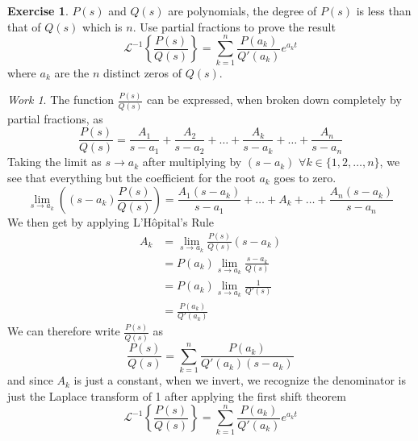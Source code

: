 \documentclass{report}
\theoremstyle{definition}
\newtheorem{exercise}{Exercise}[chapter]
\theoremstyle{remark}
\newtheorem*{work}{Work}
\newcommand{\inlt}[1]{\mathscr{L}^{-1} \left\{ #1 \right\}}
\begin{document}
\begin{exercise}
    $P(s)$ and $Q(s)$ are polynomials, the degree of $P(s)$ is less than that of $Q(s)$ which is $n$. Use partial fractions to prove the result 
    \begin{equation*}
        \inlt{\frac{P(s)}{Q(s)}} = \sum^n_{k=1} \frac{P(a_k)}{Q'(a_k)}e^{a_kt} 
    \end{equation*}
    where $a_k$ are the $n$ distinct zeros of $Q(s)$.
\end{exercise}
\begin{work}
    The function $\frac{P(s)}{Q(s)}$ can be expressed, when broken down completely by partial fractions, as 
    \begin{equation*}
        \frac{P(s)}{Q(s)} = \frac{A_1}{s-a_1} + \frac{A_2}{s-a_2}+\ldots+\frac{A_k}{s-a_k}+\ldots+\frac{A_n}{s-a_n}
    \end{equation*}
    Taking the limit as $s\rightarrow a_k$ after multiplying by $(s-a_k)\,\,\forall k \in\{1,2,\ldots,n\}$, we see that everything but the coefficient for the root $a_k$ goes to zero.
    \begin{equation*}
        \lim_{s\rightarrow a_k}\left( (s-a_k)\frac{P(s)}{Q(s)} \right)=\frac{A_1(s-a_k)}{s-a_1} + \ldots+A_k+\ldots+\frac{A_n(s-a_k)}{s-a_n}
    \end{equation*}
    We then get by applying L'H\^opital's Rule
    \begin{equation*}
        \begin{split}
            A_k &=\lim_{s\rightarrow a_k} \frac{P(s)}{Q(s)}(s-a_k) \\
            &= P(a_k) \lim_{s\rightarrow a_k} \frac{s-a_k}{Q(s)} \\ 
            &=P(a_k)\lim_{s\rightarrow a_k} \frac{1}{Q'(s)} \\
            &= \frac{P(a_k)}{Q'(a_k)}
        \end{split}
    \end{equation*}
    We can therefore write $\frac{P(s)}{Q(s)}$ as 
    \begin{equation*}
        \frac{P(s)}{Q(s)} = \sum^n_{k=1} \frac{P(a_k)}{Q'(a_k)(s-a_k)}
    \end{equation*}
    and since $A_k$ is just a constant, when we invert, we recognize the denominator is just the Laplace transform of 1 after applying the first shift theorem
    \begin{equation*}
        \inlt{\frac{P(s)}{Q(s)}} = \sum^n_{k=1} \frac{P(a_k)}{Q'(a_k)}e^{a_kt}
    \end{equation*}
\end{work}
\end{document}
